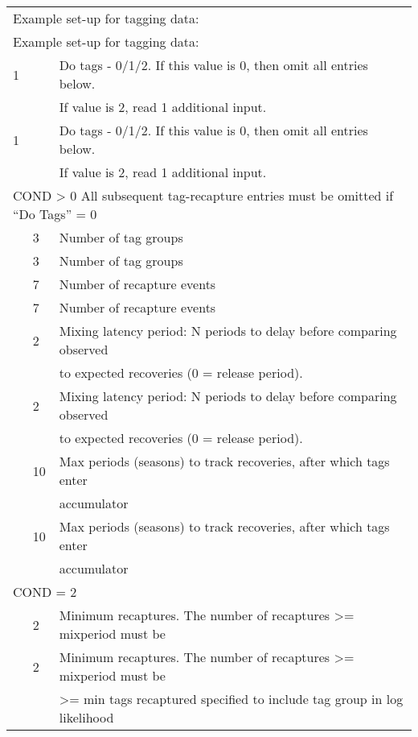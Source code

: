 \begin{center}
	\begin{tabular}{p{1.1cm} p{1.1cm} p{1.1cm} p{1.1cm} p{1.1cm} p{1.1cm} p{1.1cm} p{1.1cm} p{3cm}}
		\multicolumn{9}{l}{Example set-up for tagging data:} \\
		\multicolumn{9}{l}{Example set-up for tagging data:} \\
		\hline
		1 & & \multicolumn{7}{l}{Do tags - 0/1/2. If this value is 0, then omit all entries below.} \\
		&   & \multicolumn{7}{l}{If value is 2, read 1 additional input.} \Tstrut\Bstrut\\
		1 & & \multicolumn{7}{l}{Do tags - 0/1/2. If this value is 0, then omit all entries below.} \\
		&   & \multicolumn{7}{l}{If value is 2, read 1 additional input.} \Tstrut\Bstrut\\
		\hline
		\multicolumn{9}{l}{COND > 0 All subsequent tag-recapture entries must be omitted if ``Do Tags'' = 0}
		 \Tstrut\\

		 & 3 & \multicolumn{7}{l}{Number of tag groups} \Bstrut\\
		 & 3 & \multicolumn{7}{l}{Number of tag groups} \Bstrut\\
		 \hline
		 & 7 & \multicolumn{7}{l}{Number of recapture events} \Tstrut\Bstrut\\
		 & 7 & \multicolumn{7}{l}{Number of recapture events} \Tstrut\Bstrut\\
		 \hline
		 & 2 & \multicolumn{7}{l}{Mixing latency period: N periods to delay before comparing observed} \Tstrut\\
		 &   &  \multicolumn{7}{l}{to expected recoveries (0 = release period).} \Bstrut\\
		 & 2 & \multicolumn{7}{l}{Mixing latency period: N periods to delay before comparing observed} \Tstrut\\
		 &   &  \multicolumn{7}{l}{to expected recoveries (0 = release period).} \Bstrut\\
		 \hline
		 & 10 & \multicolumn{7}{l}{Max periods (seasons) to track recoveries, after which tags enter} \Tstrut\\
		 &    & \multicolumn{7}{l}{accumulator} \Bstrut\\
		 & 10 & \multicolumn{7}{l}{Max periods (seasons) to track recoveries, after which tags enter} \Tstrut\\
		 &    & \multicolumn{7}{l}{accumulator} \Bstrut\\
		 \hline
		 \multicolumn{9}{l}{COND = 2} \Tstrut\\
		 &  2 &  \multicolumn{7}{l}{Minimum recaptures. The number of recaptures >= mixperiod must be} \\
		 &  2 &  \multicolumn{7}{l}{Minimum recaptures. The number of recaptures >= mixperiod must be} \\
		 &    &  \multicolumn{7}{l}{>= min tags recaptured specified to include tag group in log likelihood}\Bstrut\\
		 

\end{tabular}
\end{center}
